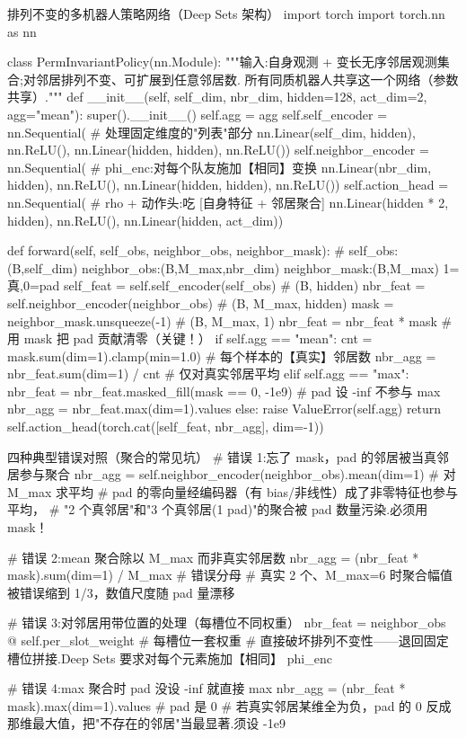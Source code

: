 \begin{codebox}[Python]{排列不变的多机器人策略网络（Deep Sets 架构）}
import torch
import torch.nn as nn

class PermInvariantPolicy(nn.Module):
    """输入:自身观测 + 变长无序邻居观测集合;对邻居排列不变、可扩展到任意邻居数.
    所有同质机器人共享这一个网络（参数共享）."""
    def __init__(self, self_dim, nbr_dim, hidden=128, act_dim=2, agg="mean"):
        super().__init__()
        self.agg = agg
        self.self_encoder = nn.Sequential(             # 处理固定维度的"列表"部分
            nn.Linear(self_dim, hidden), nn.ReLU(),
            nn.Linear(hidden, hidden), nn.ReLU())
        self.neighbor_encoder = nn.Sequential(         # phi_enc:对每个队友施加【相同】变换
            nn.Linear(nbr_dim, hidden), nn.ReLU(),
            nn.Linear(hidden, hidden), nn.ReLU())
        self.action_head = nn.Sequential(              # rho + 动作头:吃 [自身特征 + 邻居聚合]
            nn.Linear(hidden * 2, hidden), nn.ReLU(),
            nn.Linear(hidden, act_dim))

    def forward(self, self_obs, neighbor_obs, neighbor_mask):
        # self_obs:(B,self_dim)  neighbor_obs:(B,M_max,nbr_dim)  neighbor_mask:(B,M_max) 1=真,0=pad
        self_feat = self.self_encoder(self_obs)              # (B, hidden)
        nbr_feat  = self.neighbor_encoder(neighbor_obs)      # (B, M_max, hidden)
        mask = neighbor_mask.unsqueeze(-1)                   # (B, M_max, 1)
        nbr_feat = nbr_feat * mask                           # 用 mask 把 pad 贡献清零（关键！）
        if self.agg == "mean":
            cnt = mask.sum(dim=1).clamp(min=1.0)             # 每个样本的【真实】邻居数
            nbr_agg = nbr_feat.sum(dim=1) / cnt              # 仅对真实邻居平均
        elif self.agg == "max":
            nbr_feat = nbr_feat.masked_fill(mask == 0, -1e9) # pad 设 -inf 不参与 max
            nbr_agg = nbr_feat.max(dim=1).values
        else:
            raise ValueError(self.agg)
        return self.action_head(torch.cat([self_feat, nbr_agg], dim=-1))
\end{codebox}

\begin{codebox}[Python]{四种典型错误对照（聚合的常见坑）}
# 错误 1:忘了 mask，pad 的邻居被当真邻居参与聚合
nbr_agg = self.neighbor_encoder(neighbor_obs).mean(dim=1)   # 对 M_max 求平均
#   pad 的零向量经编码器（有 bias/非线性）成了非零特征也参与平均，
#   "2 个真邻居"和"3 个真邻居(1 pad)"的聚合被 pad 数量污染.必须用 mask！

# 错误 2:mean 聚合除以 M_max 而非真实邻居数
nbr_agg = (nbr_feat * mask).sum(dim=1) / M_max             # 错误分母
#   真实 2 个、M_max=6 时聚合幅值被错误缩到 1/3，数值尺度随 pad 量漂移

# 错误 3:对邻居用带位置的处理（每槽位不同权重）
nbr_feat = neighbor_obs @ self.per_slot_weight             # 每槽位一套权重
#   直接破坏排列不变性——退回固定槽位拼接.Deep Sets 要求对每个元素施加【相同】 phi_enc

# 错误 4:max 聚合时 pad 没设 -inf 就直接 max
nbr_agg = (nbr_feat * mask).max(dim=1).values              # pad 是 0
#   若真实邻居某维全为负，pad 的 0 反成那维最大值，把"不存在的邻居"当最显著.须设 -1e9
\end{codebox}

